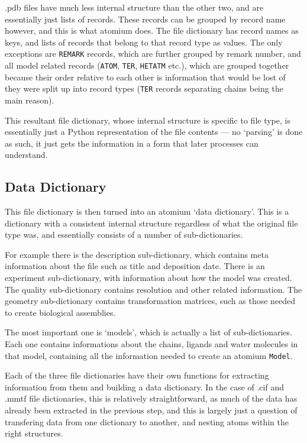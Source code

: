 .pdb files have much less internal structure than the other two, and are essentially just lists of records. These records can be grouped by record name however, and this is what atomium does. The file dictionary has record names as keys, and lists of records that belong to that record type as values. The only exceptions are \texttt{REMARK} records, which are further grouped by remark number, and all model related records (\texttt{ATOM}, \texttt{TER}, \texttt{HETATM} etc.), which are grouped together because their order relative to each other is information that would be lost of they were split up into record types (\texttt{TER} records separating chains being the main reason).

This resultant file dictionary, whose internal structure is specific to file type, is essentially just a Python representation of the file contents --- no `parsing' is done as such, it just gets the information in a form that later processes can understand.

\subsection{Data Dictionary}

This file dictionary is then turned into an atomium `data dictionary'. This is a dictionary with a consistent internal structure regardless of what the original file type was, and essentially consists of a number of sub-dictionaries.

For example there is the description sub-dictionary, which contains meta information about the file such as title and deposition date. There is an experiment sub-dictionary, with information about how the model was created. The quality sub-dictionary contains resolution and other related information. The geometry sub-dictionary contains transformation matrices, such as those needed to create biological assemblies.

The most important one is `models', which is actually a list of sub-dictionaries. Each one contains informations about the chains, ligands and water molecules in that model, containing all the information needed to create an atomium \texttt{Model}.

Each of the three file dictionaries have their own functions for extracting information from them and building a data dictionary. In the case of .cif and .mmtf file dictionaries, this is relatively straightforward, as much of the data has already been extracted in the previous step, and this is largely just a question of transfering data from one dictionary to another, and nesting atoms within the right structures.

